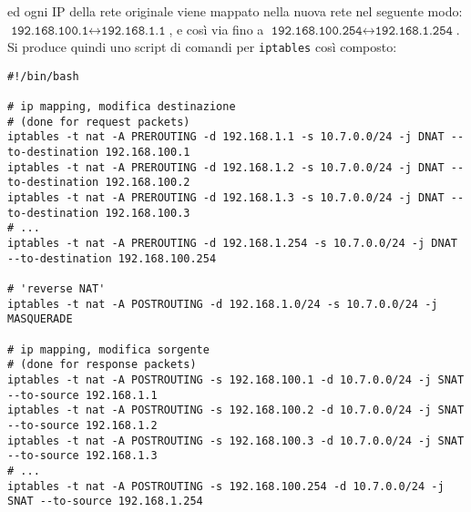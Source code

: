 ed ogni IP della rete originale viene mappato nella nuova rete nel seguente
modo: $\texttt{192.168.100.1} \leftrightarrow \texttt{192.168.1.1}$, e così via
fino a $\texttt{192.168.100.254} \leftrightarrow \texttt{192.168.1.254}$.
Si produce quindi uno script di comandi per \texttt{iptables} così composto:
\begin{verbatim}
#!/bin/bash

# ip mapping, modifica destinazione
# (done for request packets)
iptables -t nat -A PREROUTING -d 192.168.1.1 -s 10.7.0.0/24 -j DNAT --to-destination 192.168.100.1
iptables -t nat -A PREROUTING -d 192.168.1.2 -s 10.7.0.0/24 -j DNAT --to-destination 192.168.100.2
iptables -t nat -A PREROUTING -d 192.168.1.3 -s 10.7.0.0/24 -j DNAT --to-destination 192.168.100.3
# ...
iptables -t nat -A PREROUTING -d 192.168.1.254 -s 10.7.0.0/24 -j DNAT --to-destination 192.168.100.254

# 'reverse NAT'
iptables -t nat -A POSTROUTING -d 192.168.1.0/24 -s 10.7.0.0/24 -j MASQUERADE

# ip mapping, modifica sorgente
# (done for response packets)
iptables -t nat -A POSTROUTING -s 192.168.100.1 -d 10.7.0.0/24 -j SNAT --to-source 192.168.1.1
iptables -t nat -A POSTROUTING -s 192.168.100.2 -d 10.7.0.0/24 -j SNAT --to-source 192.168.1.2
iptables -t nat -A POSTROUTING -s 192.168.100.3 -d 10.7.0.0/24 -j SNAT --to-source 192.168.1.3
# ...
iptables -t nat -A POSTROUTING -s 192.168.100.254 -d 10.7.0.0/24 -j SNAT --to-source 192.168.1.254
\end{verbatim}
